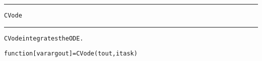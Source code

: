 \begin{samepage}
\hrule
\begin{center}
{\large \verb!CVode!}
\label{p:CVode}
\end{center}
\hrule\vspace{0.1in}



\begin{alltt}
CVode integrates the ODE.
\end{alltt}

\end{samepage}



\begin{samepage}


\begin{alltt}
function [varargout] = CVode(tout, itask) 
\end{alltt}

\end{samepage}



